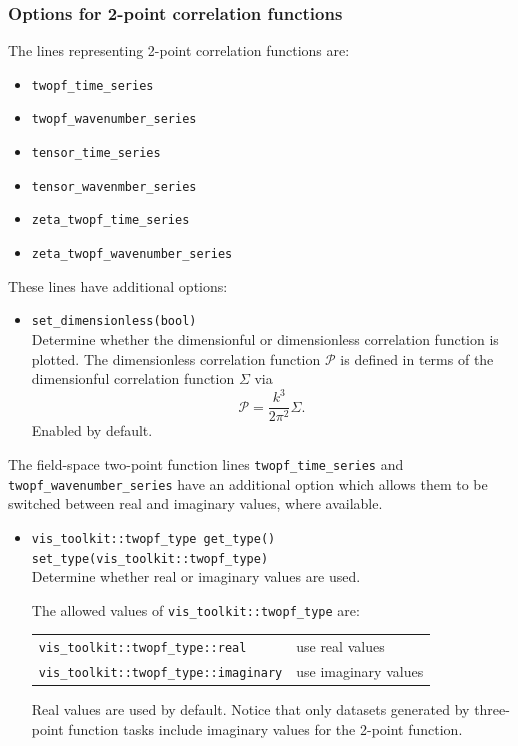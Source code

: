 \documentclass[11pt,a4paper]{article}
\newcommand{\DimlessSigma}{\mathcal{P}}
\begin{document}
\subsubsection{Options for 2-point correlation functions}
The lines representing 2-point correlation functions are:
\begin{itemize}
    \item \texttt{twopf_time_series}
    \item \texttt{twopf_wavenumber_series}
    \item \texttt{tensor_time_series}
    \item \texttt{tensor_wavenmber_series}
    \item \texttt{zeta_twopf_time_series}
    \item \texttt{zeta_twopf_wavenumber_series}
\end{itemize}
These lines
have additional options:
\begin{itemize}        
    \item \texttt{set_dimensionless(bool)} \\
    Determine whether the dimensionful or dimensionless correlation
    function is plotted.
    The dimensionless correlation function $\DimlessSigma$ is defined
    in terms of the dimensionful correlation function $\Sigma$
    via
    \begin{equation}
        \DimlessSigma = \frac{k^3}{2\pi^2} \Sigma .
    \end{equation}
    Enabled by default.
\end{itemize}
The field-space two-point function lines
\texttt{twopf_time_series}
and \texttt{twopf_wavenumber_series} have an additional option which
allows them to be switched between
real and imaginary values, where available.
\begin{itemize}
    \item \texttt{vis_toolkit::twopf_type get_type()} \\
    \texttt{set_type(vis_toolkit::twopf_type)} \\
    Determine whether real or imaginary values are used.
    
    The allowed values
    of \texttt{vis_toolkit::twopf_type} are: \\
    \begin{tabular}{p{6.5cm}p{7.5cm}}
        \texttt{vis_toolkit::twopf_type::real} & use real values \\
        \texttt{vis_toolkit::twopf_type::imaginary} & use imaginary values    
    \end{tabular}
    Real values are used by default.
    Notice that only datasets generated by three-point function tasks
    include imaginary values for the 2-point function.
\end{itemize}
\end{document}
